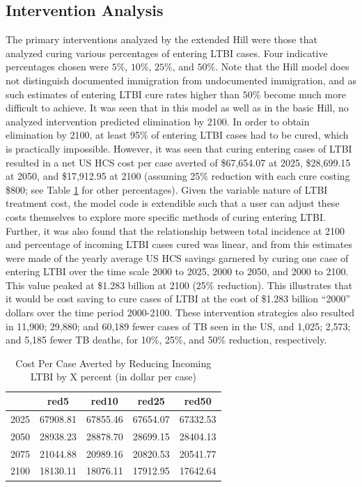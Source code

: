 \documentclass{amsart}
\begin{document}
\subsection{Intervention Analysis}
The primary interventions analyzed by the extended Hill were those that analyzed
curing various percentages of entering LTBI cases. Four indicative percentages
chosen were $5\%$, $10\%$, $25\%$, and $50\%$. Note that the Hill model does
not distinguish documented immigration from undocumented immigration, and as
such estimates of entering LTBI cure rates higher than $50\%$ become much more
difficult to achieve. It was seen that in this model as well as in the basic
Hill, no analyzed intervention predicted elimination by 2100. In order to obtain
elimination by 2100, at least 95\% of entering LTBI cases had to be cured, which
is practically impossible. However, it was seen that curing entering cases of
LTBI resulted in a net US HCS cost per case averted of \$67,654.07 at 2025, \$28,699.15 at 2050,
and \$17,912.95 at 2100 (assuming 25\% reduction with each cure costing \$800; see Table
\ref{tab:cpcaArt} for other percentages). Given the variable nature of LTBI
treatment cost, the model code is extendible such that a user can adjust these
costs themselves to explore more specific methods of curing entering LTBI.
Further, it was also found that the relationship between total incidence at 2100
and percentage of incoming LTBI cases cured was linear, and from this estimates
were made of the yearly average US HCS savings garnered by curing one case of
entering LTBI over the time scale 2000 to 2025, 2000 to 2050, and 2000 to 2100.
This value peaked at \$1.283 billion at 2100 (25\% reduction). This illustrates
that it would be cost saving to cure cases of LTBI at the cost of \$1.283
billion ``2000'' dollars over the time period 2000-2100. These intervention
strategies also resulted in 11,900; 29,880; and 60,189 fewer cases of TB seen in
the US, and 1,025; 2,573; and 5,185 fewer TB deaths, for 10\%, 25\%, and 50\%
reduction, respectively.

\begin{table}
\centering
\begin{tabular}{|r|cccc|} \hline
       & red5     & red10    & red25    & red50    \\ \hline
  2025 & 67908.81 & 67855.46 & 67654.07 & 67332.53 \\ 
  2050 & 28938.23 & 28878.70 & 28699.15 & 28404.13 \\ 
  2075 & 21044.88 & 20989.16 & 20820.53 & 20541.77 \\ 
  2100 & 18130.11 & 18076.11 & 17912.95 & 17642.64 \\ \hline
\end{tabular}
\caption{Cost Per Case Averted by Reducing Incoming LTBI by X percent (in dollar per case)} 
\label{tab:cpcaArt}
\end{table}
\end{document}
